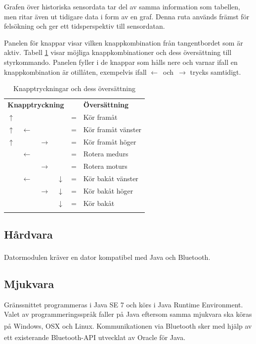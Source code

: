 \documentclass[11pt]{article}
\begin{document}
\begin{flushleft}
Grafen över historiska sensordata tar del av samma information som tabellen, men ritar även ut tidigare data i form av en graf. Denna ruta används främst för felsökning och ger ett tidsperspektiv till sensordatan.

Panelen för knappar visar vilken knappkombination från tangentbordet som är aktiv. Tabell \ref{datormodul:combinations} visar möjliga knappkombinationer och dess översättning till styrkommando. Panelen fyller i de knappar som hålls nere och varnar ifall en knappkombination är otillåten, exempelvis ifall \mbox{$\leftarrow$ och $\rightarrow$} trycks samtidigt.

\begin{longtable}{|p{.05\linewidth} p{.05\linewidth} p{.05\linewidth} p{.05\linewidth} c l|}
	\multicolumn{4}{c}{\textbf{Knapptryckning}} & & \multicolumn{1}{l}{\textbf{Översättning}} 	\\ \nobreakhline\nobreakhline 
	$\uparrow$ &  				&  				& 				& = & Kör framåt 				\\ \nobreakhline 
	$\uparrow$ & $\leftarrow$	&				&				& = & Kör framåt vänster 		\\ \nobreakhline 
	$\uparrow$ &				& $\rightarrow$	&				& = & Kör framåt höger 			\\ \nobreakhline 
			   & $\leftarrow$	&				&				& = & Rotera medurs 			\\ \nobreakhline
			   &				& $\rightarrow$	&				& = & Rotera moturs 			\\ \nobreakhline
			   & $\leftarrow$	&				& $\downarrow$	& = & Kör bakåt vänster 		\\ \nobreakhline
			   &				& $\rightarrow$ & $\downarrow$	& = & Kör bakåt höger 			\\ \nobreakhline
			   &				&				& $\downarrow$	& = & Kör bakåt 				\\ \nobreakhline
	\caption{Knapptryckningar och dess översättning} \label{datormodul:combinations}
\end{longtable}



\subsection{Hårdvara}
Datormodulen kräver en dator kompatibel med Java och Bluetooth\textsuperscript{\circledR}. 

\subsection{Mjukvara}
Gränssnittet programmeras i Java SE 7 och körs i Java Runtime Environment. Valet av programmeringsspråk faller på Java eftersom samma mjukvara ska köras på Windows, OSX och Linux. Kommunikationen via Bluetooth\textsuperscript{\circledR} sker med hjälp av ett existerande Bluetooth\textsuperscript{\circledR}-API utvecklat av Oracle för Java. 


\end{flushleft}
\end{document}
